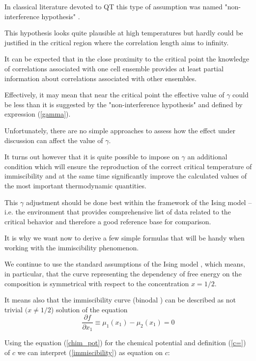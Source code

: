 \documentclass[12pt,abstract]{scrartcl}
\begin{document}
In classical literature devoted to QT this type of  assumption was named "non-interference  hypothesis"  \cite{GUGGENHEIM1952}.

This hypothesis looks quite plausible at high temperatures  but hardly could be justified in the critical region where the correlation length aims to infinity.

It can be expected  that in the close proximity to the critical point the knowledge of correlations associated with one cell ensemble provides at least partial information about correlations associated with   other ensembles. 

Effectively, it may mean that near the critical point  the effective value of $\gamma$  could be less than it is suggested by the  "non-interference  hypothesis" and defined by expression (\ref{gamma}).


Unfortunately, there are no simple approaches to assess how the  effect under discussion can      affect the value of           $\gamma$.


It turns out  however \cite{KREMER1985, tisr1988} that it is quite possible to impose on  $\gamma$ an additional condition which will ensure  the reproduction of  the correct critical temperature  of immiscibility and at the same time  significantly improve the calculated values of the  most important thermodynamic quantities.


This $\gamma$ adjustment should be done best within the framework of the Ising model  -- i.e. the environment that provides comprehensive list of data related to the critical behavior \cite{Domb1974} and therefore a good reference base for comparison.
	

It is why we want now to derive a few simple formulas that will be handy when working with the immiscibility phenomenon.

We continue to use  the standard assumptions of the Ising model \cite{Domb1974}, which means, in particular, that the curve representing the dependency of  free energy on the composition is symmetrical with respect to  the concentration $x = 1/2$.


It means also that the immiscibility curve (binodal \cite{Hillert2008}) can be described as not trivial $(x \neq 1/2$) solution of the  equation
\begin{equation} \label{immiscibility}
\frac{\partial f}{\partial x_1}  \equiv \mu_1(x_1) - \mu_2(x_1) = 0
\end{equation}

Using the equation (\ref{chim_pot}) for the chemical potential and definition (\ref{c=}) of $c$ we can interpret (\ref{immiscibility}) as equation on $c$:
\end{document}
